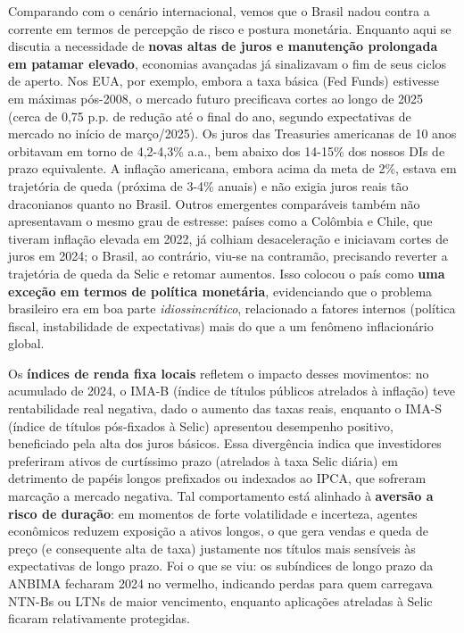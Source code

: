 \documentclass[a4paper,12pt]{article}
\begin{document}
Comparando com o cenário internacional, vemos que o Brasil nadou contra a corrente em termos de percepção de risco e postura monetária. Enquanto aqui se discutia a necessidade de \textbf{novas altas de juros e manutenção prolongada em patamar elevado}, economias avançadas já sinalizavam o fim de seus ciclos de aperto. Nos EUA, por exemplo, embora a taxa básica (Fed Funds) estivesse em máximas pós-2008, o mercado futuro precificava cortes ao longo de 2025 (cerca de 0,75 p.p. de redução até o final do ano, segundo expectativas de mercado no início de março/2025). Os juros das Treasuries americanas de 10 anos orbitavam em torno de 4,2-4,3\% a.a., bem abaixo dos 14-15\% dos nossos DIs de prazo equivalente. A inflação americana, embora acima da meta de 2\%, estava em trajetória de queda (próxima de 3-4\% anuais) e não exigia juros reais tão draconianos quanto no Brasil. Outros emergentes comparáveis também não apresentavam o mesmo grau de estresse: países como a Colômbia e Chile, que tiveram inflação elevada em 2022, já colhiam desaceleração e iniciavam cortes de juros em 2024; o Brasil, ao contrário, viu-se na contramão, precisando reverter a trajetória de queda da Selic e retomar aumentos. Isso colocou o país como \textbf{uma exceção em termos de política monetária}, evidenciando que o problema brasileiro era em boa parte \textit{idiossincrático}, relacionado a fatores internos (política fiscal, instabilidade de expectativas) mais do que a um fenômeno inflacionário global.

Os \textbf{índices de renda fixa locais} refletem o impacto desses movimentos: no acumulado de 2024, o IMA-B (índice de títulos públicos atrelados à inflação) teve rentabilidade real negativa, dado o aumento das taxas reais, enquanto o IMA-S (índice de títulos pós-fixados à Selic) apresentou desempenho positivo, beneficiado pela alta dos juros básicos. Essa divergência indica que investidores preferiram ativos de curtíssimo prazo (atrelados à taxa Selic diária) em detrimento de papéis longos prefixados ou indexados ao IPCA, que sofreram marcação a mercado negativa. Tal comportamento está alinhado à \textbf{aversão a risco de duração}: em momentos de forte volatilidade e incerteza, agentes econômicos reduzem exposição a ativos longos, o que gera vendas e queda de preço (e consequente alta de taxa) justamente nos títulos mais sensíveis às expectativas de longo prazo. Foi o que se viu: os subíndices de longo prazo da ANBIMA fecharam 2024 no vermelho, indicando perdas para quem carregava NTN-Bs ou LTNs de maior vencimento, enquanto aplicações atreladas à Selic ficaram relativamente protegidas.
\end{document}

